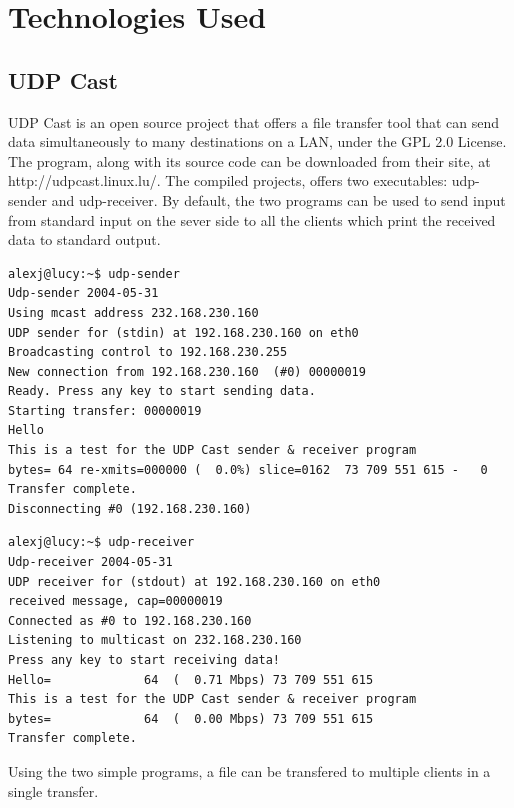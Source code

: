 

\chapter{Technologies Used}\label{ch:tech}
\bigskip

\section{UDP Cast}

UDP Cast is an open source project that offers a file transfer tool
that can send data simultaneously to many destinations on a \ac{LAN}, under
the \ac{GPL} 2.0 License. The program, along with its source code can be
downloaded from their site, at http://udpcast.linux.lu/.
The compiled projects, offers two executables:  udp-sender and
udp-receiver. By default, the two programs can be used to send input
from standard input on the sever side to all the clients which print
the received data to standard output.

\begin{lstlisting}[caption=Simple udp-sender running]
alexj@lucy:~$ udp-sender
Udp-sender 2004-05-31
Using mcast address 232.168.230.160
UDP sender for (stdin) at 192.168.230.160 on eth0 
Broadcasting control to 192.168.230.255
New connection from 192.168.230.160  (#0) 00000019
Ready. Press any key to start sending data.
Starting transfer: 00000019
Hello
This is a test for the UDP Cast sender & receiver program
bytes= 64 re-xmits=000000 (  0.0%) slice=0162  73 709 551 615 -   0
Transfer complete.
Disconnecting #0 (192.168.230.160)

\end{lstlisting}

\begin{lstlisting}[caption=Simple udp-receiver running]
alexj@lucy:~$ udp-receiver
Udp-receiver 2004-05-31
UDP receiver for (stdout) at 192.168.230.160 on eth0
received message, cap=00000019
Connected as #0 to 192.168.230.160
Listening to multicast on 232.168.230.160
Press any key to start receiving data!
Hello=             64  (  0.71 Mbps) 73 709 551 615 
This is a test for the UDP Cast sender & receiver program
bytes=             64  (  0.00 Mbps) 73 709 551 615 
Transfer complete.
\end{lstlisting}


Using the two simple programs, a file can be transfered to multiple clients
in a single transfer.





